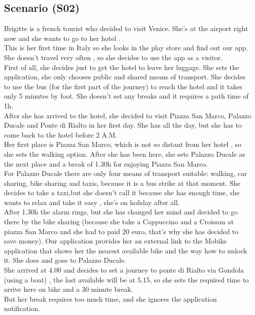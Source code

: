\documentclass[a4paper,leqno]{book}
\begin{document}
\subsection{Scenario (S02) }
Brigitte is a french tourist who decided to visit Venice. She's at the airport right now and she wants to go to her hotel .\\
This is her first time in Italy so she looks in the play store and find out our app.
She doesn't travel very often , so she decides to use the app as a visitor.\\
First of all, she decides just to get the hotel to leave her luggage.
She sets the application, she only chooses public and shared means of transport. 
She decides to use the bus (for the first part of the journey) to reach the hotel and  it takes only 5 minutes by foot. 
She doesn't set any breaks and it requires a path time of 1h.\\
After she has arrived to the hotel, she decided to visit Piazza San Marco, Palazzo Ducale and Ponte di Rialto in her first day.
She has all the day, but she has to come back to the hotel before 2 A.M.\\
Her first place is Piazza San Marco, which is not so distant from her hotel , so she sets the walking option. 
After she has been here, she sets Palazzo Ducale as the next place and a break of 1.30h for enjoying Piazza San Marco.\\
For Palazzo Ducale there are only four means of transport suitable: walking, car sharing, bike sharing and taxis, because it is a bus strike at that moment. 
She decides to take a taxi,but she doesn't call it because she has enough time,  she wants to relax and take it easy , she's on holiday after all.\\
After 1.30h the alarm rings, but she has changed her mind  and decided to go there by the bike sharing (because she take a Cappuccino and a Croissan at piazza San Marco and she had to paid 20 euro, that's why she has decided to save money). 
Our application provides her an external link to the Mobike application that shows her the nearest available bike and the way how to unlock it.
She does and goes to Palazzo Ducale.\\
She arrived at 4.00 and decides to set a journey to ponte di Rialto via Gondola (using a boat) , the last available will be at 5.15, so she sets the required time to arrive here on bike and a 30 minute break.\\
But her break requires too much time, and she ignores the application notification.\\
\end{document}
